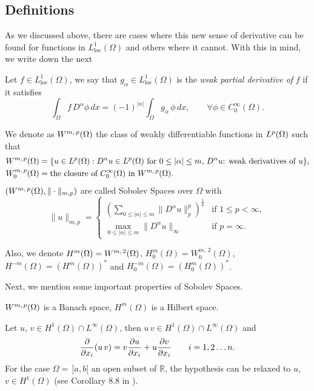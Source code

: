 \subsection*{Definitions} 
As we discussed above, there are cases where this new sense of derivative can be found for functions in $L_\text{loc}^1(\Omega)$ and others where it cannot. With this in mind, we write down the next
\begin{definition} Let $f\in L_\text{loc}^1(\Omega)$, we say that $g_\alpha\in L_\text{loc}^1(\Omega)$ is the \emph{weak partial derivative of} $f$ if it satisfies
\begin{equation}
\int_\Omega f\,D^\alpha \phi\,dx=(-1)^{|\alpha|} \int_\Omega g_\alpha\,\phi\,dx,\qquad \forall \phi \in C_0^\infty(\Omega).
\end{equation}
\end{definition}
\begin{definition}We denote as ${W^{m,\,p}(\Omega)}$ the class of weakly differentiable functions in ${L^{p}(\Omega)}$ such that
\begin{align*}
{W^{m,\,p}(\Omega)}&=\{u\in{L^{p}(\Omega)}:D^{\alpha}u\in {L^{p}(\Omega)} \text{ for }0\leq |\alpha| \leq m,\, D^{\alpha}u\text{: weak derivatives of }u\},\\
W^{m,\,p}_0(\Omega)&=\text{the closure of }C_0^\infty(\Omega)\text{ in }{W^{m,\,p}(\Omega)}.
\end{align*}
$\left({W^{m,\,p}(\Omega)},\|\cdot\|_{m,p}\right)$ are called Sobolev Spaces over $\Omega$ with
\begin{equation}
\|u\|_{m,p}=\left\{\begin{array}{ll}
\left(\sum_{0\leq|\alpha|\leq m}\|D^\alpha u\|^p_p \right) ^\frac{1}{p}&\text{if }1\leq p < \infty,\\
\max_{0\leq|\alpha|\leq m}\|D^\alpha u\|_\infty&\text{if }p=\infty.
\end{array}\right.
\end{equation}

Also, we denote $H^m(\Omega)={W^{m,\,2}(\Omega)}$, $H_0^m(\Omega)=W^{m,\,2}_0(\Omega)$, $H^{-m}(\Omega)=\left(H^m(\Omega)\right)^*$ and $H_0^{-m}(\Omega)=\left(H_0^m(\Omega)\right)^*$.
\end{definition}

Next, we mention some important properties of Sobolev Spaces.
\begin{theorem}
${W^{m,\,p}(\Omega)}$ is a Banach space, $H^m(\Omega)$ is a Hilbert space.
\end{theorem}
\begin{theorem}\label{theo:product_differentiation}
Let $u$, $v\in H^1(\Omega)\cap L^\infty(\Omega)$, then $u\,v\in H^1(\Omega)\cap L^\infty(\Omega)$ and
$$\frac{\partial }{\partial x_i}(u\,v)=v\frac{\partial u}{\partial x_i}+u\frac{\partial v}{\partial x_i} \qquad i=1,2\ldots n.$$
For the case $\Omega=\,]a,b[$ an open subset of $\mathbb{R}$, the hypothesis can be relaxed to $u$, $v\in H^1(\Omega)$ (see Corollary 8.8 in \cite{brezis2011}).
\end{theorem}

